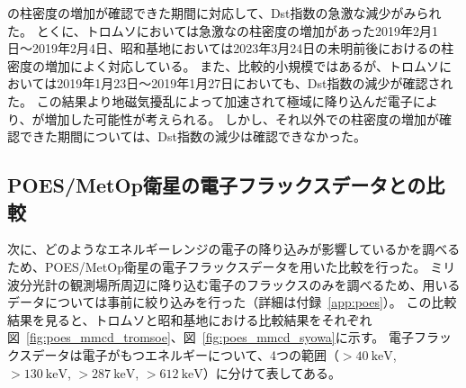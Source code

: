 の柱密度の増加が確認できた期間に対応して、Dst指数の急激な減少がみられた。
とくに、トロムソにおいては急激なの柱密度の増加があった2019年2月1日〜2019年2月4日、昭和基地においては2023年3月24日の未明前後におけるの柱密度の増加によく対応している。
また、比較的小規模ではあるが、トロムソにおいては2019年1月23日〜2019年1月27日においても、Dst指数の減少が確認された。
この結果より地磁気擾乱によって加速されて極域に降り込んだ電子により、が増加した可能性が考えられる。
しかし、それ以外での柱密度の増加が確認できた期間については、Dst指数の減少は確認できなかった。


\subsection{POES/MetOp衛星の電子フラックスデータとの比較}
\label{ssec:comparison_poes}
次に、どのようなエネルギーレンジの電子の降り込みが影響しているかを調べるため、POES/MetOp衛星の電子フラックスデータを用いた比較を行った。
ミリ波分光計の観測場所周辺に降り込む電子のフラックスのみを調べるため、用いるデータについては事前に絞り込みを行った（詳細は付録~\ref{app:poes}）。
この比較結果を見ると、トロムソと昭和基地における比較結果をそれぞれ図~\ref{fig:poes_mmcd_tromsoe}、図~\ref{fig:poes_mmcd_syowa}に示す。
電子フラックスデータは電子がもつエネルギーについて、4つの範囲（$>40\ \mathrm{keV}$, $>130\ \mathrm{keV}$, $>287\ \mathrm{keV}$, $>612\ \mathrm{keV}$）に分けて表してある。

